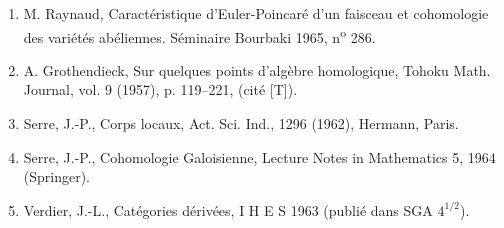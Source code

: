 \documentclass[11pt]{article}
\begin{document}
\begin{enumerate}
\item[{[1]}] M. Raynaud, Caractéristique d'Euler-Poincaré d'un faisceau et cohomologie des variétés abéliennes. Séminaire Bourbaki 1965, n\textsuperscript{o} 286.
\item[{[2]}] A. Grothendieck, Sur quelques points d'algèbre homologique, Tohoku Math. Journal, vol. 9 (1957), p. 119--221, (cité [T]).
\item[{[3]}] Serre, J.-P., Corps locaux, Act. Sci. Ind., 1296 (1962), Hermann, Paris.
\item[{[4]}] Serre, J.-P., Cohomologie Galoisienne, Lecture Notes in Mathematics 5, 1964 (Springer).
\item[{[5]}] Verdier, J.-L., Catégories dérivées, I H E S 1963 (publié dans SGA $4^{1/2}$).
\end{enumerate}
\end{document}
